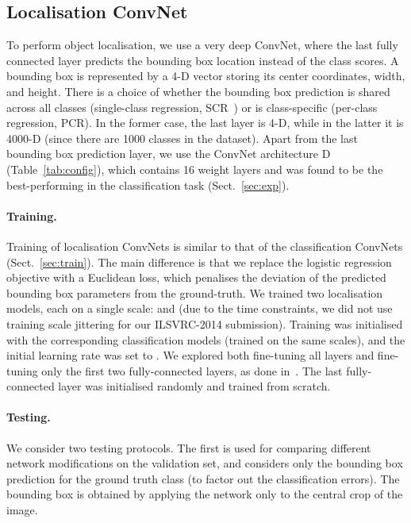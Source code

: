 \documentclass{article} \usepackage{iclr2015,times}
\newcommand{\tblref}[1]{Table~\ref{#1}}
\newcommand{\sref}[1]{Sect.~\ref{#1}}
\begin{document}
\subsection{Localisation ConvNet}
\label{sec:loc_method}
To perform object localisation, we use a very deep ConvNet, where the last fully connected layer predicts the bounding box location instead of the class scores.
A bounding box is represented by a 4-D vector storing its center coordinates, width, and height. There is a choice of whether the bounding box prediction is shared across all classes
(single-class regression, SCR~\citep{Sermanet14}) or is class-specific (per-class regression, PCR). In the former case, the last layer is 4-D, while in the latter it is 4000-D (since
there are 1000 classes in the dataset).
Apart from the last bounding box prediction layer, we use the ConvNet architecture D (\tblref{tab:config}), which contains 16 weight layers and was found to be the best-performing in the classification task
(\sref{sec:exp}). 


\paragraph{Training.} 
Training of localisation ConvNets is similar to that of the classification ConvNets (\sref{sec:train}).
The main difference is that we replace the logistic regression objective with a Euclidean loss, which penalises the deviation of the predicted bounding box parameters from the ground-truth.
We trained two localisation models, each on a single scale:  and  (due to the time constraints, we did not use training scale jittering for our ILSVRC-2014 submission).
Training was initialised with the corresponding classification models (trained on the same scales), and the initial learning rate was set to .
We explored both fine-tuning all layers and fine-tuning only the first two fully-connected layers, as done in~\citep{Sermanet14}. The last fully-connected layer was
initialised randomly and trained from scratch.

\paragraph{Testing.} 
We consider two testing protocols. 
The first is used for comparing different network modifications on the validation set, and considers only the bounding box prediction for the ground truth class (to factor out the classification errors).
The bounding box is obtained by applying the network only to the central crop of the image.
\end{document}
